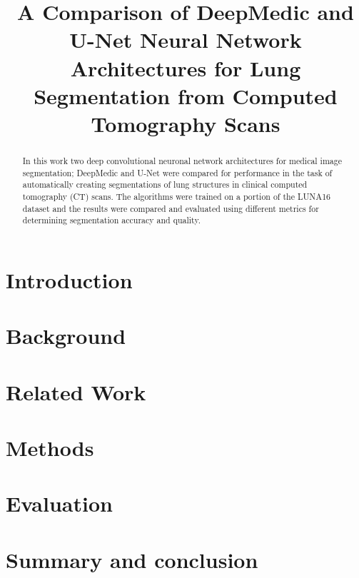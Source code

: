 \documentclass[conference]{IEEEtran}
\begin{document}
\title{A Comparison of DeepMedic and U-Net Neural Network Architectures for Lung Segmentation from Computed Tomography Scans}

\author{
	\and
	\and
	\and
}


\maketitle

\begin{abstract}
In this work two deep convolutional neuronal network architectures for medical image segmentation; DeepMedic and U-Net were compared for performance in the task of automatically creating segmentations of lung structures in clinical computed tomography (CT) scans. The algorithms were trained on a portion of the LUNA16 dataset and the results were compared and evaluated using different metrics for determining segmentation accuracy and quality.
\end{abstract}

\section{Introduction}



\section{Background}


\section{Related Work}


\section{Methods}


\section{Evaluation}


\section{Summary and conclusion}




\end{document}
